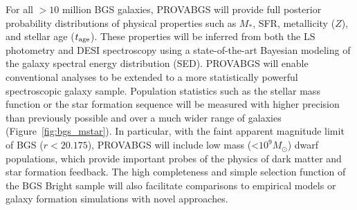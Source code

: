 
For all ${>}10$ million BGS galaxies, PROVABGS will provide full posterior
probability distributions of physical properties such as $M_*$, SFR,
metallicity ($Z$), and stellar age ($t_{\rm age}$). 
These properties will be inferred from both the LS photometry and DESI
spectroscopy using a state-of-the-art Bayesian modeling of the galaxy spectral
energy distribution (SED). 
PROVABGS will enable conventional analyses to be extended to a more
statistically powerful spectroscopic galaxy sample. 
Population statistics such as the stellar mass function or the star formation
sequence will be measured with higher precision than previously possible and
over a much wider range of galaxies (Figure~\ref{fig:bgs_mstar}). 
In particular, with the faint apparent magnitude limit of BGS ($r < 20.175$),
PROVABGS will include low mass (<$10^9M_\odot$) dwarf populations, which
provide important probes of the physics of dark matter and star formation
feedback.
The high completeness and simple selection function of the BGS Bright sample
will also facilitate comparisons to empirical models or galaxy formation
simulations with novel approaches. 

